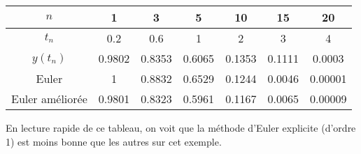 {\begin{enumerate}
{		\begin{tabular}{|c|c|c|c|c|c|c|}
			\hline 
			$n$ & 1 & 3 & 5 & 10 & 15 & 20 \\ 
			\hline 
			$t_n$ & 0.2 & 0.6 & 1 & 2 & 3 & 4 \\ 
			\hline 
			$y(t_n)$ & 0.9802 & 0.8353 & 0.6065 & 0.1353 & 0.1111 & 0.0003 \\ 
			\hline 
			Euler & 1 & 0.8832 & 0.6529 & 0.1244 & 0.0046 & 0.00001 \\ 
			\hline 
			Euler améliorée & 0.9801 & 0.8323 & 0.5961 & 0.1167 & 0.0065 & 0.00009 \\ 
			\hline 
		\end{tabular} 
		
		En lecture rapide de ce tableau, on voit que la méthode d'Euler explicite (d'ordre 1) est moins bonne que les autres sur cet exemple.}

\end{enumerate}}
